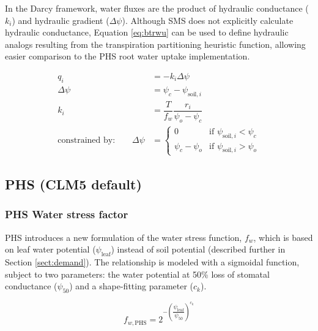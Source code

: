 \documentclass[draft,linenumbers]{agujournal}
\begin{document}
    In the Darcy framework, water fluxes are the product of hydraulic conductance ($k_i$) and hydraulic gradient ($\Delta\psi$).
    Although SMS does not explicitly calculate hydraulic conductance, Equation \ref{eq:btrwu} can be used to define hydraulic analogs resulting from the transpiration partitioning heuristic function, 
    allowing easier comparison to the PHS root water uptake implementation.
    
    \begin{linenomath*}
    \begin{equation} \begin{aligned}
    q_i &= -k_i\Delta\psi \\
    \Delta\psi &=  \psi_{c}-\psi_{\text{soil},i} \\
    k_i &= \dfrac{T}{f_w} \dfrac{r_i}{\psi_{o}-\psi_{c}} \\
    \mbox{constrained by:} \qquad
    \Delta\psi &=
    \begin{cases}
    0                          & \text{if } \psi_{\text{soil},i}<\psi_{c}  \\
    \psi_{c}-\psi_{o} & \text{if } \psi_{\text{soil},i}>\psi_{o}
    \label{kb}
    \end{cases}
    \end{aligned}\end{equation}
    \end{linenomath*}
    
    
   
\subsection{PHS (CLM5 default)}
    \label{sect:phs}
    \subsubsection{PHS Water stress factor}
    \label{sect:fwphs}
    
    PHS introduces a new formulation of the water stress function, $f_w$, which is based on leaf water potential ($\psi_{\text{leaf}}$) instead of soil potential (described further in Section \ref{sect:demand}). The relationship is modeled with a sigmoidal function, subject to two parameters: the water potential at 50\% loss of stomatal conductance ($\psi_{50}$) and a shape-fitting parameter ($c_k$).
    
    \begin{linenomath*}
    \begin{equation}
    f_{w,\text{PHS}} = 2^{-\left(\dfrac{\psi_{\text{leaf}}}{\psi_{50}}\right)^{c_k}}
    \label{eq:fwphs}
    \end{equation}
    \end{linenomath*}
    
\end{document}
